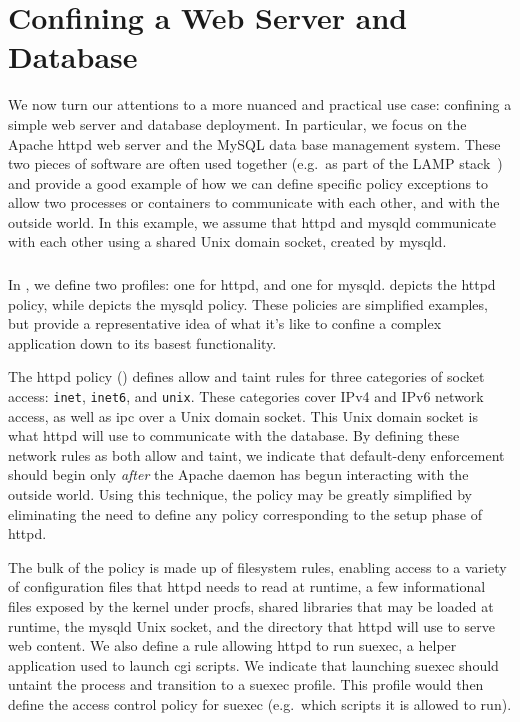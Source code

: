 \section{Confining a Web Server and Database}

We now turn our attentions to a more nuanced and practical use case: confining a simple
web server and database deployment. In particular, we focus on the Apache httpd web server
and the MySQL data base management system. These two pieces of software are often used
together (e.g.~as part of the LAMP stack~) and provide a good example of how we
can define specific policy exceptions to allow two processes or containers to communicate
with each other, and with the outside world. In this example, we assume that httpd and
mysqld communicate with each other using a shared Unix domain socket, created by mysqld.

\subsubsection{\bpfbox{}}

In \bpfbox{}, we define two profiles: one for httpd, and one for mysqld.
 depicts the httpd policy, while  depicts
the mysqld policy. These policies are simplified examples, but provide a representative
idea of what it's like to confine a complex application down to its basest functionality.

The httpd policy () defines allow and taint rules for three
categories of socket access: \texttt{inet}, \texttt{inet6}, and \texttt{unix}. These
categories cover IPv4 and IPv6 network access, as well as \gls{ipc} over a Unix domain
socket. This Unix domain socket is what httpd will use to communicate with the database.
By defining these network rules as both allow and taint, we indicate that default-deny
enforcement should begin only \textit{after} the Apache daemon has begun interacting with
the outside world. Using this technique, the \bpfbox{} policy may be greatly simplified by
eliminating the need to define any policy corresponding to the setup phase of httpd.

The bulk of the \bpfbox{} policy is made up of filesystem rules, enabling access to
a variety of configuration files that httpd needs to read at runtime, a few informational
files exposed by the kernel under procfs, shared libraries that may be loaded at runtime,
the mysqld Unix socket, and the directory that httpd will use to serve web content. We
also define a rule allowing httpd to run suexec, a helper application used to launch
\gls{cgi} scripts.  We indicate that launching suexec should untaint the process and
transition to a suexec profile.  This profile would then define the access control policy
for suexec (e.g.~which scripts it is allowed to run).

